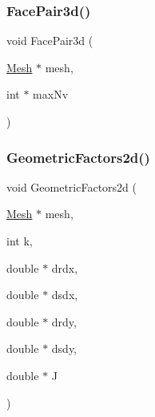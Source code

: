 \subsubsection{\texorpdfstring{Face\+Pair3d()}{FacePair3d()}}
{\footnotesize\ttfamily void Face\+Pair3d (\begin{DoxyParamCaption}\item[{\hyperlink{a00557_aeffbe0891ab73a4d8964c9cb7978426e}{Mesh} $\ast$}]{mesh,  }\item[{int $\ast$}]{max\+Nv }\end{DoxyParamCaption})}

\mbox{\label{a00554_a17dce51b6f44350809fb0f67f41bf80a}} 
\subsubsection{\texorpdfstring{Geometric\+Factors2d()}{GeometricFactors2d()}}
{\footnotesize\ttfamily void Geometric\+Factors2d (\begin{DoxyParamCaption}\item[{\hyperlink{a00557_aeffbe0891ab73a4d8964c9cb7978426e}{Mesh} $\ast$}]{mesh,  }\item[{int}]{k,  }\item[{double $\ast$}]{drdx,  }\item[{double $\ast$}]{dsdx,  }\item[{double $\ast$}]{drdy,  }\item[{double $\ast$}]{dsdy,  }\item[{double $\ast$}]{J }\end{DoxyParamCaption})}

\mbox{\label{a00554_a962817a1e01d941ede2d0a7e31f136d7}} 
